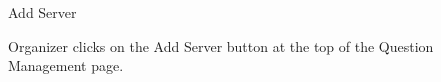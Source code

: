 
\begin{uc}{Add Server}

    
    \begin{uc-trig}
        Organizer clicks on the Add Server button at the top of the Question Management
        page.
    \end{uc-trig}
\end{uc}

